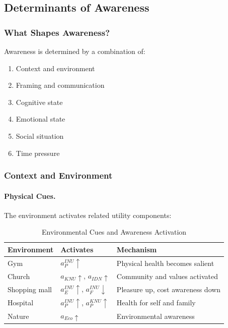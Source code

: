 \subsection{Determinants of Awareness}
\label{subsec:awareness-determinants}

\subsubsection{What Shapes Awareness?}

Awareness is determined by a combination of:
\begin{enumerate}
\item Context and environment
\item Framing and communication
\item Cognitive state
\item Emotional state
\item Social situation
\item Time pressure
\end{enumerate}

\subsubsection{Context and Environment}

\paragraph{Physical Cues.}
The environment activates related utility components:

\begin{table}[htbp]
\centering
\caption{Environmental Cues and Awareness Activation}
\label{tab:environmental-cues}
\renewcommand{\arraystretch}{1.3}
\begin{tabular}{@{}lll@{}}
\toprule
\textbf{Environment} & \textbf{Activates} & \textbf{Mechanism} \\
\midrule
Gym & $a^{INU}_P \uparrow$ & Physical health becomes salient \\
Church & $a_{KNU} \uparrow$, $a_{IDN} \uparrow$ & Community and values activated \\
Shopping mall & $a^{INU}_E \uparrow$, $a^{INU}_F \downarrow$ & Pleasure up, cost awareness down \\
Hospital & $a^{INU}_P \uparrow$, $a^{KNU}_P \uparrow$ & Health for self and family \\
Nature & $a_{Eco} \uparrow$ & Environmental awareness \\
\bottomrule
\end{tabular}
\end{table}

